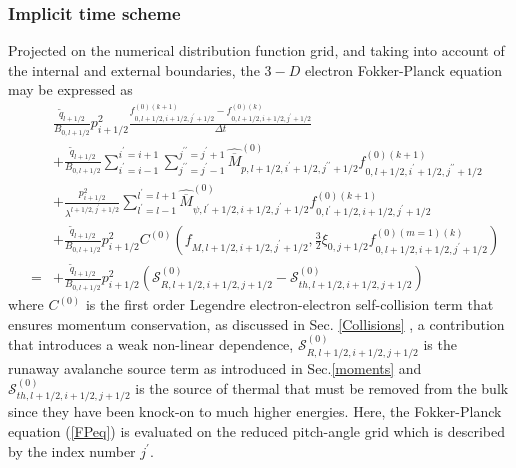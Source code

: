 

\subsubsection{Implicit time scheme}

\label{fpmatrixsection}

Projected on the numerical distribution function grid, and taking into
account of the internal and external boundaries, the $3-D$ electron
Fokker-Planck equation may be expressed as
\begin{eqnarray}
&&\frac{\widetilde{q}_{l+1/2}}{B_{0,l+1/2}}p_{i+1/2}^{2}\frac{
f_{0,l+1/2,i+1/2,j^{\prime }+1/2}^{\left( 0\right)
(k+1)}-f_{0,l+1/2,i+1/2,j^{\prime }+1/2}^{\left( 0\right) (k)}}{\Delta t}
\nonumber \\
&&+\frac{\widetilde{q}_{l+1/2}}{B_{0,l+1/2}}\sum_{i^{\prime
}=i-1}^{i^{\prime }=i+1}\sum_{j^{\prime \prime }=j^{\prime }-1}^{j^{\prime
\prime }=j^{\prime }+1}\widehat{\overline{M}}_{p,l+1/2,i^{\prime
}+1/2,j^{\prime \prime }+1/2}^{\left( 0\right) }f_{0,l+1/2,i^{\prime
}+1/2,j^{\prime \prime }+1/2}^{\left( 0\right) (k+1)}  \nonumber \\
&&+\frac{p_{i+1/2}^{2}}{\lambda ^{l+1/2,j^{\prime }+1/2}}\sum_{l^{\prime
}=l-1}^{l^{\prime }=l+1}\widehat{\overline{M}}_{\psi ,l^{\prime
}+1/2,i+1/2,j^{\prime }+1/2}^{\left( 0\right) }f_{0,l^{\prime
}+1/2,i+1/2,j^{\prime }+1/2}^{\left( 0\right) (k+1)}  \nonumber \\
&&+\frac{\widetilde{q}_{l+1/2}}{B_{0,l+1/2}}p_{i+1/2}^{2}C^{\left( 0\right)
}\left( f_{M,l+1/2,i+1/2,j^{\prime }+1/2},\frac{3}{2}\xi
_{0,j+1/2}f_{0,l+1/2,i+1/2,j^{\prime }+1/2}^{\left( 0\right) (m=1)\left(
k\right) }\right)   \nonumber \\
&=&+\frac{\widetilde{q}_{l+1/2}}{B_{0,l+1/2}}p_{i+1/2}^{2}\left( \mathcal{S}%
_{R,l+1/2,i+1/2,j+1/2}^{\left( 0\right) }-\mathcal{S}%
_{th,l+1/2,i+1/2,j+1/2}^{\left( 0\right) }\right)   \label{FPeq}
\end{eqnarray}
where $C^{\left( 0\right) }$ is the first order Legendre electron-electron
self-collision term that ensures momentum conservation, as discussed in Sec.%
\ref{Collisions} , a contribution that introduces a weak non-linear
dependence, $\mathcal{S}_{R,l+1/2,i+1/2,j+1/2}^{\left( 0\right) }$ is the
runaway avalanche source term as introduced in Sec.\ref{moments} and $%
\mathcal{S}_{th,l+1/2,i+1/2,j+1/2}^{\left( 0\right) }$ is the source of
thermal that must be removed from the bulk since they have been knock-on to
much higher energies. Here, the Fokker-Planck equation (\ref{FPeq}) is
evaluated on the reduced pitch-angle grid which is described by the index
number $j^{\prime }$.

